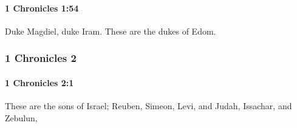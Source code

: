 		\paragraph{1 Chronicles 1:54} %
			\label{1CHRONICLES-1-54}

			Duke Magdiel, duke Iram. These are the dukes of Edom.

	\subsubsection{1 Chronicles 2} %
		\label{1CHRONICLES-2}

		\paragraph{1 Chronicles 2:1} %
			\label{1CHRONICLES-2-1}

			These are the sons of Israel; Reuben, Simeon, Levi, and Judah, Issachar, and Zebulun,

